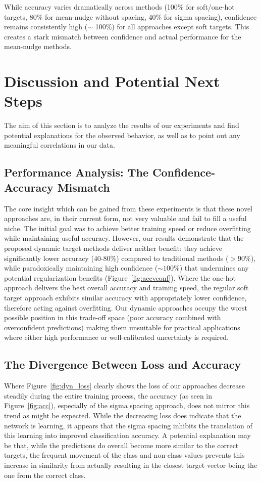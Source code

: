 \documentclass[12pt,fleqn,a4paper]{article}
\begin{document}
While accuracy varies dramatically across methods (100\% for soft/one-hot targets, 80\% for mean-nudge without spacing, 40\% for sigma spacing), confidence remains consistently high ($\sim$ 100\%) for all approaches except soft targets. This creates a stark mismatch between confidence and actual performance for the mean-nudge methods.

\section{Discussion and Potential Next Steps}
The aim of this section is to analyze the results of our experiments and find potential explanations for the observed behavior, as well as to point out any meaningful correlations in our data.

\subsection{Performance Analysis: The Confidence-Accuracy Mismatch}
The core insight which can be gained from these experiments is that these novel approaches are, in their current form, not very valuable and fail to fill a useful niche. The initial goal was to achieve better training speed or reduce overfitting while maintaining useful accuracy. However, our results demonstrate that the proposed dynamic target methods deliver neither benefit: they achieve significantly lower accuracy (40-80\%) compared to traditional methods ($> 90\%$), while paradoxically maintaining high confidence ($\sim 100\%$) that undermines any potential regularization benefits (Figure~\ref{fig:accvconf}).
Where the one-hot approach delivers the best overall accuracy and training speed, the regular soft target approach exhibits similar accuracy with appropriately lower confidence, therefore acting against overfitting. Our dynamic approaches occupy the worst possible position in this trade-off space (poor accuracy combined with overconfident predictions) making them unsuitable for practical applications where either high performance or well-calibrated uncertainty is required.

\subsection{The Divergence Between Loss and Accuracy}
Where Figure~\ref{fig:dyn_loss} clearly shows the loss of our approaches decrease steadily during the entire training process, the accuracy (as seen in Figure~\ref{fig:acc}), especially of the sigma spacing approach, does not mirror this trend as might be expected. While the decreasing loss does indicate that the network is learning, it appears that the sigma spacing inhibits the translation of this learning into improved classification accuracy. A potential explanation may be that, while the predictions do overall become more similar to the correct targets, the frequent movement of the class and non-class values prevents this increase in similarity from actually resulting in the closest target vector being the one from the correct class.
\end{document}
